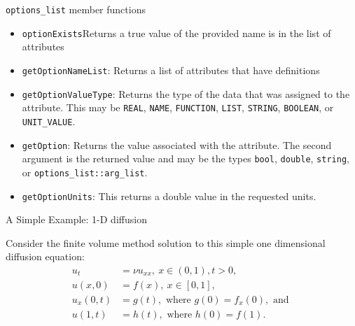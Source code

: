 \documentclass{beamer}
\begin{document}
\begin{frame}{{\tt options\_list} member functions}
\begin{itemize}
\item {\tt optionExists}Returns a true value of the provided name is in the list of attributes
\item{\tt getOptionNameList}: Returns a list of attributes that have definitions
\item{\tt getOptionValueType}: Returns the type of the data that was assigned to the attribute.  This may be {\tt REAL}, {\tt NAME}, {\tt FUNCTION}, {\tt LIST}, {\tt STRING}, {\tt BOOLEAN}, or {\tt UNIT\_VALUE}.

\item {\tt getOption}: Returns the value associated with the attribute.  The second argument is the returned value and may be the types {\tt bool}, {\tt double}, {\tt string}, or {\tt options\_list::arg\_list}.

\item {\tt getOptionUnits}: This returns a double value in the requested units.
\end{itemize}
\end{frame}

\begin{frame}{A Simple Example: 1-D diffusion}

  Consider the finite volume method solution to this simple one
  dimensional diffusion equation:
\begin{align*}
u_t      & =  \nu u_{xx},~ x \in (0,1), t>0,\\
u(x,0)   & =  f(x),~ x \in [0,1],\\
u_x(0,t) & =  g(t), \mbox{ where } g(0) = f_x(0), \mbox{ and }\\
u(1,t) & =  h(t), \mbox{ where } h(0) = f(1).
\end{align*}

\end{frame}
\end{document}
